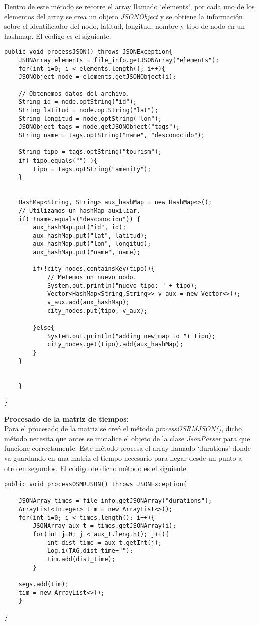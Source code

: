 Dentro de este método se recorre el array llamado \enquote*{elements}, por cada uno de los elementos del array se crea un objeto \textit{JSONObject} y se obtiene la información sobre el identificador del nodo, latitud, longitud, nombre y tipo de nodo en un hashmap. El código es el siguiente.\newline
\newpage
\begin{lstlisting}[caption=Función para procesar información sobre POIs y alojamientos.]
public void processJSON() throws JSONException{
	JSONArray elements = file_info.getJSONArray("elements");
	for(int i=0; i < elements.length(); i++){
	JSONObject node = elements.getJSONObject(i);
	
	// Obtenemos datos del archivo.
	String id = node.optString("id");
	String latitud = node.optString("lat");
	String longitud = node.optString("lon");
	JSONObject tags = node.getJSONObject("tags");
	String name = tags.optString("name", "desconocido");
	
	String tipo = tags.optString("tourism");
	if( tipo.equals("") ){
		tipo = tags.optString("amenity");
	}
	
	
	HashMap<String, String> aux_hashMap = new HashMap<>();
	// Utilizamos un hashMap auxiliar.
	if( !name.equals("desconocido")) {
		aux_hashMap.put("id", id);
		aux_hashMap.put("lat", latitud);
		aux_hashMap.put("lon", longitud);
		aux_hashMap.put("name", name);
		
		if(!city_nodes.containsKey(tipo)){
			// Metemos un nuevo nodo.
			System.out.println("nuevo tipo: " + tipo);
			Vector<HashMap<String,String>> v_aux = new Vector<>();
			v_aux.add(aux_hashMap);
			city_nodes.put(tipo, v_aux);
		
		}else{
			System.out.println("adding new map to "+ tipo);
			city_nodes.get(tipo).add(aux_hashMap);
		}
	}
	
	
	}

}
\end{lstlisting}
\vspace{0.06in}
\textbf{Procesado de la matriz de tiempos:}\\
Para el procesado de la matriz se creó el método \textit{processOSRMJSON()}, dicho método necesita que antes se inicialice el objeto de la clase \textit{JsonParser} para que funcione correctamente.
Este método procesa el array llamado \enquote*{durations} donde va guardando en una matriz el tiempo necesario para llegar desde un punto a otro en segundos. El código de dicho método es el siguiente.
\newpage
\begin{lstlisting}[caption=Función para procesar matriz de tiempos entre puntos.]
public void processOSMRJSON() throws JSONException{

	JSONArray times = file_info.getJSONArray("durations");
	ArrayList<Integer> tim = new ArrayList<>();
	for(int i=0; i < times.length(); i++){
		JSONArray aux_t = times.getJSONArray(i);
		for(int j=0; j < aux_t.length(); j++){
			int dist_time = aux_t.getInt(j);
			Log.i(TAG,dist_time+"");
			tim.add(dist_time);
		}
	
	segs.add(tim);
	tim = new ArrayList<>();
	}

}
\end{lstlisting}
